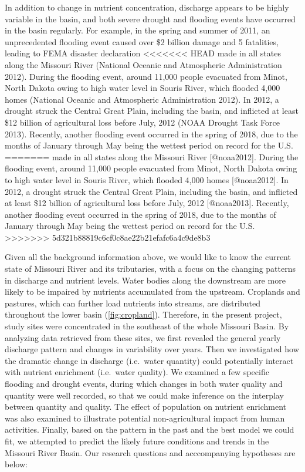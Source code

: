 \documentclass[12pt,]{article}
\begin{document}
In addition to change in nutrient concentration, discharge appears to be
highly variable in the basin, and both severe drought and flooding
events have occurred in the basin regularly. For example, in the spring
and summer of 2011, an unprecedented flooding event caused over \$2
billion damage and 5 fatalities, leading to FEMA disaster declaration
<<<<<<< HEAD
made in all states along the Missouri River (National Oceanic and
Atmospheric Administration 2012). During the flooding event, around
11,000 people evacuated from Minot, North Dakota owing to high water
level in Souris River, which flooded 4,000 homes (National Oceanic and
Atmospheric Administration 2012). In 2012, a drought struck the Central
Great Plain, including the basin, and inflicted at least \$12 billion of
agricultural loss before July, 2012 (NOAA Drought Task Force 2013).
Recently, another flooding event occurred in the spring of 2018, due to
the months of January through May being the wettest period on record for
the U.S.
=======
made in all states along the Missouri River {[}@noaa2012{]}. During the
flooding event, around 11,000 people evacuated from Minot, North Dakota
owing to high water level in Souris River, which flooded 4,000 homes
{[}@noaa2012{]}. In 2012, a drought struck the Central Great Plain,
including the basin, and inflicted at least \$12 billion of agricultural
loss before July, 2012 {[}@noaa2013{]}. Recently, another flooding event
occurred in the spring of 2018, due to the months of January through May
being the wettest period on record for the U.S.
>>>>>>> 5d321b88819c6cf0c8ae22b21efafc6a4c9de8b3

Given all the background information above, we would like to know the
current state of Missouri River and its tributaries, with a focus on the
changing patterns in discharge and nutrient levels. Water bodies along
the downstream are more likely to be impaired by nutrients accumulated
from the upstream. Croplands and pastures, which can further load
nutrients into streams, are distributed throughout the lower basin
(\autoref{fig:cropland}). Therefore, in the present project, study sites
were concentrated in the southeast of the whole Missouri Basin. By
analyzing data retrieved from these sites, we first revealed the general
yearly discharge pattern and changes in variability over years. Then we
investigated how the dramatic change in discharge (i.e.~water quantity)
could potentially interact with nutrient enrichment (i.e.~water
quality). We examined a few specific flooding and drought events, during
which changes in both water quality and quantity were well recorded, so
that we could make inference on the interplay between quantity and
quality. The effect of population on nutrient enrichment was also
examined to illustrate potential non-agricultural impact from human
activities. Finally, based on the pattern in the past and the best model
we could fit, we attempted to predict the likely future conditions and
trends in the Missouri River Basin. Our research questions and
acccompanying hypotheses are below:
\end{document}
